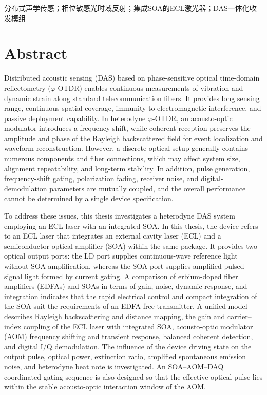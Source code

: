 \smallskip
{} 分布式声学传感；相位敏感光时域反射；集成SOA的ECL激光器；DAS一体化收发模组


\chapter*{\bfseries \sffamily Abstract}
\thispagestyle{main}

Distributed acoustic sensing (DAS) based on phase-sensitive optical time-domain reflectometry ($\varphi$-OTDR) enables continuous measurements of vibration and dynamic strain along standard telecommunication fibers. It provides long sensing range, continuous spatial coverage, immunity to electromagnetic interference, and passive deployment capability. In heterodyne $\varphi$-OTDR, an acousto-optic modulator introduces a frequency shift, while coherent reception preserves the amplitude and phase of the Rayleigh backscattered field for event localization and waveform reconstruction. However, a discrete optical setup generally contains numerous components and fiber connections, which may affect system size, alignment repeatability, and long-term stability. In addition, pulse generation, frequency-shift gating, polarization fading, receiver noise, and digital-demodulation parameters are mutually coupled, and the overall performance cannot be determined by a single device specification.

To address these issues, this thesis investigates a heterodyne DAS system employing an ECL laser with an integrated SOA. In this thesis, the device refers to an ECL laser that integrates an external cavity laser (ECL) and a semiconductor optical amplifier (SOA) within the same package. It provides two optical output ports: the LD port supplies continuous-wave reference light without SOA amplification, whereas the SOA port supplies amplified pulsed signal light formed by current gating. A comparison of erbium-doped fiber amplifiers (EDFAs) and SOAs in terms of gain, noise, dynamic response, and integration indicates that the rapid electrical control and compact integration of the SOA suit the requirements of an EDFA-free transmitter. A unified model describes Rayleigh backscattering and distance mapping, the gain and carrier--index coupling of the ECL laser with integrated SOA, acousto-optic modulator (AOM) frequency shifting and transient response, balanced coherent detection, and digital I/Q demodulation. The influence of the device driving state on the output pulse, optical power, extinction ratio, amplified spontaneous emission noise, and heterodyne beat note is investigated. An SOA--AOM--DAQ coordinated gating sequence is also designed so that the effective optical pulse lies within the stable acousto-optic interaction window of the AOM.

